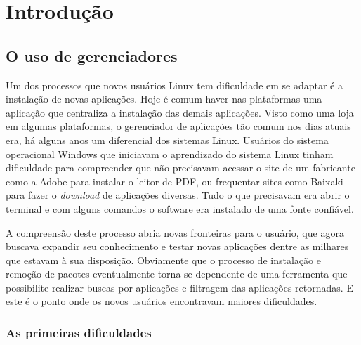 \chapter*[Introdução]{Introdução}


\section*{O uso de gerenciadores} %
\label{sec:o_uso_de_gerenciadores}


Um dos processos  que novos usuários Linux tem dificuldade em se adaptar é a instalação de novas aplicações. Hoje é comum haver nas plataformas uma aplicação que centraliza a instalação das demais aplicações. Visto como uma loja em algumas plataformas, o gerenciador de aplicações tão comum nos dias atuais era, há alguns anos um diferencial dos sistemas Linux. Usuários do sistema operacional Windows que iniciavam o aprendizado do sistema Linux  tinham dificuldade para compreender que não precisavam acessar o site de um fabricante como a Adobe para instalar o leitor de PDF, ou frequentar sites como Baixaki para fazer o \textit{download} de aplicações diversas. Tudo o que precisavam era abrir o terminal e com alguns comandos o software era instalado de uma fonte confiável. 

A compreensão deste processo abria novas fronteiras para o  usuário, que agora buscava expandir seu conhecimento e testar novas aplicações dentre as milhares que estavam à sua disposição. Obviamente que o processo de instalação e remoção de pacotes eventualmente torna-se dependente de uma ferramenta que possibilite realizar buscas por aplicações e filtragem das aplicações retornadas. E este é o ponto onde os novos usuários encontravam maiores dificuldades. 

\subsection*{As primeiras dificuldades} %
\label{sub:as_primeiras_dificuldades}



